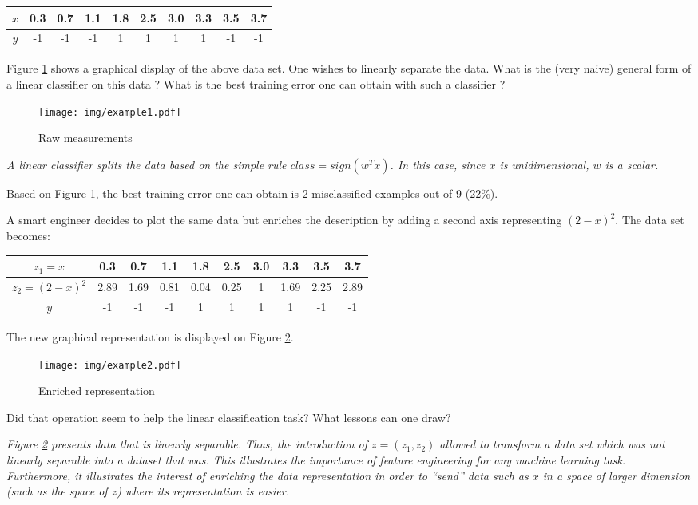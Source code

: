 \documentclass{article}
\begin{document}
\begin{tabular}{|c|c|c|c|c|c|c|c|c|c|}
\hline
$x$ & 0.3 & 0.7 & 1.1 & 1.8 & 2.5 & 3.0 & 3.3 & 3.5 & 3.7 \\
\hline
$y$ & -1  & -1  &  -1 &  1  &  1  &  1  & 1   & -1  & -1\\
\hline
\end{tabular}

\noindent {} Figure \ref{fig:1} shows a graphical display of the above data set. One wishes to linearly separate the data. What is the (very naive) general form of a linear classifier on this data ? What is the best training error one can obtain with such a classifier ? 

\begin{figure}[h!]
\begin{center}
\texttt{[image: img/example1.pdf]}
\end{center}
\label{fig:1}
\caption{Raw measurements}
\end{figure}

{\it A linear classifier splits the data based on the simple rule $class=sign(w^T x)$. In this case, since $x$ is unidimensional, $w$ is a scalar.

Based on Figure \ref{fig:1}, the best training error one can obtain is 2 misclassified examples out of 9 (22\%).
}

A smart engineer decides to plot the same data but enriches the description by adding a second axis representing $(2-x)^2$. The data set becomes:

\begin{tabular}{|c|c|c|c|c|c|c|c|c|c|}
\hline
$z_1=x$ & 0.3 & 0.7 & 1.1 & 1.8 & 2.5 & 3.0 & 3.3 & 3.5 & 3.7 \\
\hline
$z_2=(2-x)^2$ & 2.89 & 1.69 & 0.81 & 0.04 & 0.25 & 1 & 1.69 & 2.25 & 2.89\\
\hline
$y$ & -1  & -1  &  -1 &  1  &  1  &  1  & 1   & -1  & -1\\
\hline
\end{tabular}
The new graphical representation is displayed on Figure \ref{fig:2}.
\begin{figure}[h!]
\begin{center}
\texttt{[image: img/example2.pdf]}
\end{center}
\label{fig:2}
\caption{Enriched representation}
\end{figure}

\noindent {} Did that operation seem to help the linear classification task? What lessons can one draw?

{\it Figure \ref{fig:2} presents data that is linearly separable. Thus, the introduction of $z=(z_1,z_2)$ allowed to transform a data set which was not linearly separable into a dataset that was. This illustrates the importance of feature engineering for any machine learning task. Furthermore, it illustrates the interest of enriching the data representation in order to ``send'' data such as $x$ in a space of larger dimension (such as the space of $z$) where its representation is easier.
}
\end{document}

